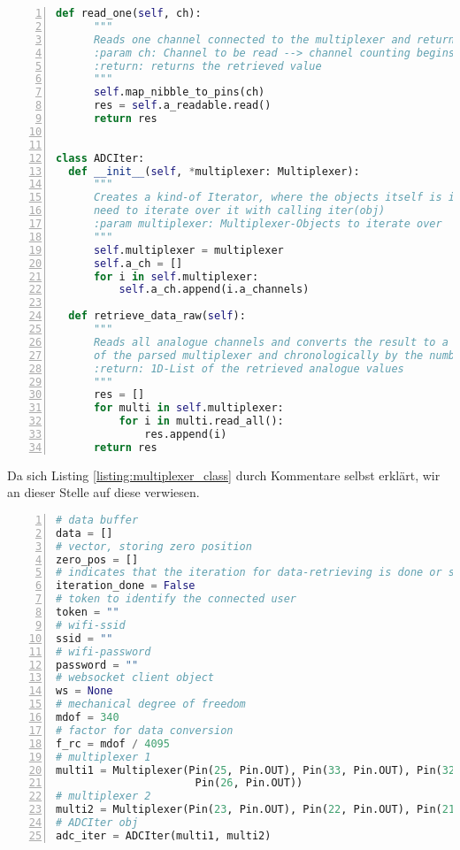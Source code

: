 \documentclass[paper=a4,12pt]{scrreprt}
\begin{document}
\begin{lstlisting}[caption={Firmware: Multiplexer- und Iterator-Objekt}, captionpos=b, label={listing:multiplexer_class}, language=python, morekeywords={async, await, False, True, None}, numbers=left,
  stepnumber=1]
  def read_one(self, ch):
      """
      Reads one channel connected to the multiplexer and returns teh retrieved value
      :param ch: Channel to be read --> channel counting begins at 0!
      :return: returns the retrieved value
      """
      self.map_nibble_to_pins(ch)
      res = self.a_readable.read()
      return res


class ADCIter:
  def __init__(self, *multiplexer: Multiplexer):
      """
      Creates a kind-of Iterator, where the objects itself is iterating over the parsed multiplexers, so there is no
      need to iterate over it with calling iter(obj)
      :param multiplexer: Multiplexer-Objects to iterate over
      """
      self.multiplexer = multiplexer
      self.a_ch = []
      for i in self.multiplexer:
          self.a_ch.append(i.a_channels)

  def retrieve_data_raw(self):
      """
      Reads all analogue channels and converts the result to a 1D-List, where the items are ordered by the order the
      of the parsed multiplexer and chronologically by the number of the pins on the multiplexer board
      :return: 1D-List of the retrieved analogue values
      """
      res = []
      for multi in self.multiplexer:
          for i in multi.read_all():
              res.append(i)
      return res
\end{lstlisting}

Da sich Listing \ref{listing:multiplexer_class} durch Kommentare selbst erklärt, wir an dieser Stelle auf diese verwiesen.\newline

\begin{lstlisting}[caption={Firmware: Globale Variablen}, captionpos=b, label={listing:globals}, language=python, morekeywords={async, await, False, True, None}, numbers=left,
  stepnumber=1]
# data buffer
data = []
# vector, storing zero position
zero_pos = []
# indicates that the iteration for data-retrieving is done or still ongoing
iteration_done = False
# token to identify the connected user
token = ""
# wifi-ssid
ssid = ""
# wifi-password
password = ""
# websocket client object
ws = None
# mechanical degree of freedom
mdof = 340
# factor for data conversion
f_rc = mdof / 4095
# multiplexer 1
multi1 = Multiplexer(Pin(25, Pin.OUT), Pin(33, Pin.OUT), Pin(32, Pin.OUT), Pin(12, Pin.OUT), ADC(Pin(34)), 12,
                      Pin(26, Pin.OUT))
# multiplexer 2
multi2 = Multiplexer(Pin(23, Pin.OUT), Pin(22, Pin.OUT), Pin(21, Pin.OUT), None, ADC(Pin(35)), 10, Pin(5, Pin.OUT))
# ADCIter obj
adc_iter = ADCIter(multi1, multi2)
\end{lstlisting}
\end{document}

